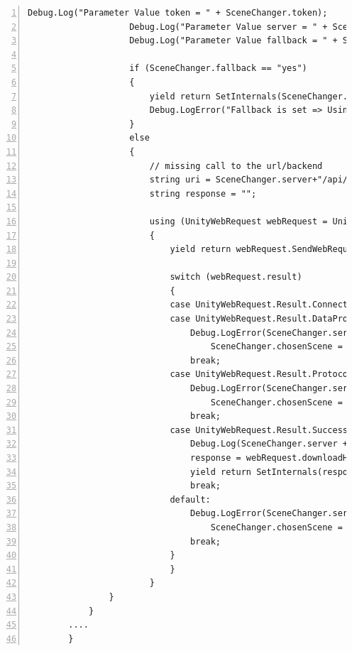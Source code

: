 \begin{lstlisting}[numbers=left,caption={SceneChanger},label={lst:unity-scene-changer-start}]
                    Debug.Log("Parameter Value token = " + SceneChanger.token);
                    Debug.Log("Parameter Value server = " + SceneChanger.server);
                    Debug.Log("Parameter Value fallback = " + SceneChanger.fallback);
                    
                    if (SceneChanger.fallback == "yes")
                    {
                        yield return SetInternals(SceneChanger.fallbackResponse);
                        Debug.LogError("Fallback is set => Using simulation init parameters to start with!");
                    }
                    else
                    {
                        // missing call to the url/backend
                        string uri = SceneChanger.server+"/api/Memoryland?token=" + SceneChanger.token;
                        string response = "";
                        
                        using (UnityWebRequest webRequest = UnityWebRequest.Get(uri))
                        {
                            yield return webRequest.SendWebRequest();
                        
                            switch (webRequest.result)
                            {
                            case UnityWebRequest.Result.ConnectionError:
                            case UnityWebRequest.Result.DataProcessingError:
                                Debug.LogError(SceneChanger.server + ": Error: " + webRequest.error);
                                    SceneChanger.chosenScene = "ERROR";
                                break;
                            case UnityWebRequest.Result.ProtocolError:
                                Debug.LogError(SceneChanger.server + ": HTTP Error: " + webRequest.error);
                                    SceneChanger.chosenScene = "ERROR";
                                break;
                            case UnityWebRequest.Result.Success:
                                Debug.Log(SceneChanger.server + ": Received: " + webRequest.downloadHandler.text);
                                response = webRequest.downloadHandler.text;
                                yield return SetInternals(response);
                                break;
                            default:
                                Debug.LogError(SceneChanger.server + ": unknown " + webRequest.result.ToString());
                                    SceneChanger.chosenScene = "ERROR";
                                break;
                            }
                            }
                        }
                }		
            }
        ....
        }
\end{lstlisting}
    

